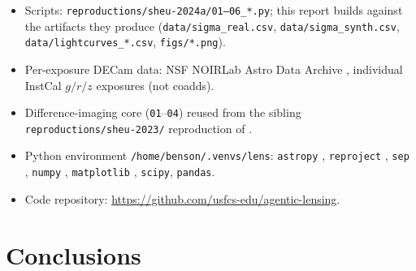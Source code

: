 \documentclass[11pt,letterpaper]{article}
\begin{document}
\begin{itemize}
\item Scripts: \texttt{reproductions/sheu-2024a/01--06\_*.py}; this report
      builds against the artifacts they produce
      (\texttt{data/sigma\_real.csv}, \texttt{data/sigma\_synth.csv},
      \texttt{data/lightcurves\_*.csv}, \texttt{figs/*.png}).
\item Per-exposure DECam data: NSF NOIRLab Astro Data Archive
      \autocite{nsf_noirlab_archive}, individual InstCal $g/r/z$ exposures
      (not coadds).
\item Difference-imaging core (\texttt{01}--\texttt{04}) reused from the
      sibling \texttt{reproductions/sheu-2023/} reproduction of
      \citet{sheu2023lensedsne}.
\item Python environment \texttt{/home/benson/.venvs/lens}:
      \texttt{astropy} \autocite{astropy2013,astropy2018},
      \texttt{reproject} \autocite{reproject2020},
      \texttt{sep} \autocite{barbary2016sep,barbary2018sep},
      \texttt{numpy} \autocite{harris2020numpy},
      \texttt{matplotlib} \autocite{hunter2007matplotlib},
      \texttt{scipy}, \texttt{pandas}.
\item Code repository: \url{https://github.com/usfcs-edu/agentic-lensing}.
\end{itemize}


\section{Conclusions}
\end{document}
